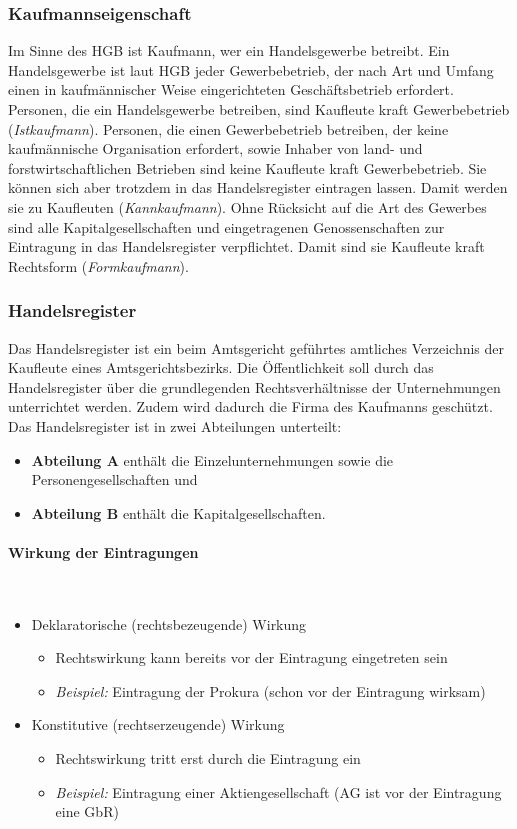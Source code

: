 \subsubsection{Kaufmannseigenschaft}
Im Sinne des HGB ist Kaufmann, wer ein Handelsgewerbe betreibt. Ein Handelsgewerbe ist laut HGB jeder Gewerbebetrieb, der nach Art und Umfang einen in kaufmännischer Weise eingerichteten Geschäftsbetrieb erfordert. Personen, die ein Handelsgewerbe betreiben, sind Kaufleute kraft Gewerbebetrieb ({\it Istkaufmann}). Personen, die einen Gewerbebetrieb betreiben, der keine kaufmännische Organisation erfordert, sowie Inhaber von land- und forstwirtschaftlichen Betrieben sind keine Kaufleute kraft Gewerbebetrieb. Sie können sich aber trotzdem in das Handelsregister eintragen lassen. Damit werden sie zu Kaufleuten ({\it Kannkaufmann}). Ohne Rücksicht auf die Art des Gewerbes sind alle Kapitalgesellschaften und eingetragenen Genossenschaften zur Eintragung in das Handelsregister verpflichtet. Damit sind sie Kaufleute kraft Rechtsform ({\it Formkaufmann}).

\subsubsection{Handelsregister}
Das Handelsregister ist ein beim Amtsgericht geführtes amtliches Verzeichnis der Kaufleute eines Amtsgerichtsbezirks. Die Öffentlichkeit soll durch das Handelsregister über die grundlegenden Rechtsverhältnisse der Unternehmungen unterrichtet werden. Zudem wird dadurch die Firma des Kaufmanns geschützt. Das Handelsregister ist in zwei Abteilungen unterteilt:
\begin{itemize}
	\item {\bf Abteilung A} enthält die Einzelunternehmungen sowie die Personengesellschaften und
	\item {\bf Abteilung B} enthält die Kapitalgesellschaften.
\end{itemize}

\paragraph{Wirkung der Eintragungen}~\\
\begin{itemize}
	\item Deklaratorische (rechtsbezeugende) Wirkung
	\begin{itemize}
		\item Rechtswirkung kann bereits vor der Eintragung eingetreten sein
		\item {\it Beispiel:} Eintragung der Prokura (schon vor der Eintragung wirksam)
	\end{itemize}
	\item Konstitutive (rechtserzeugende) Wirkung
	\begin{itemize}
		\item Rechtswirkung tritt erst durch die Eintragung ein
		\item {\it Beispiel:} Eintragung einer Aktiengesellschaft (AG ist vor der Eintragung eine GbR)
	\end{itemize}
\end{itemize}

